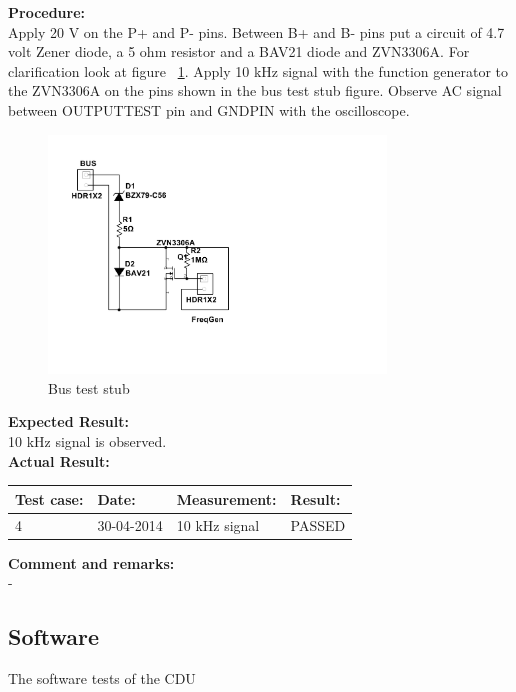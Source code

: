 \textbf{Procedure:}\\
Apply 20 V on the P+ and P- pins. Between B+ and B- pins put a circuit of 4.7 volt Zener diode, a 5 ohm resistor and a BAV21 diode and ZVN3306A. For clarification look at figure ~\ref{fig:busteststub}. Apply 10 kHz signal with the function generator to the ZVN3306A on the pins shown in the bus test stub figure. Observe AC signal between OUTPUTTEST pin and GNDPIN with the oscilloscope.\\
\begin{figure}[H]
\centering
\includegraphics[width=0.8\textwidth]{billeder/BusTestStub}
\caption{Bus test stub}
\label{fig:busteststub}
\end{figure} 


\textbf{Expected Result:}\\
10 kHz signal is observed.\\

\textbf{Actual Result:}\\
\begin{table}[H]
\centering
\begin{tabular}{|p{2cm}|p{2cm}|p{3cm}|p{2cm}|}\hline
\textbf{Test case:} & \textbf{Date:} & \textbf{Measurement:} & \textbf{Result:} \\ \hline
4 & 30-04-2014 & 10 kHz signal & PASSED \\ \hline
\end{tabular}
\end{table}

\textbf{Comment and remarks:}\\
-\\

\subsection{Software}
The software tests of the CDU
